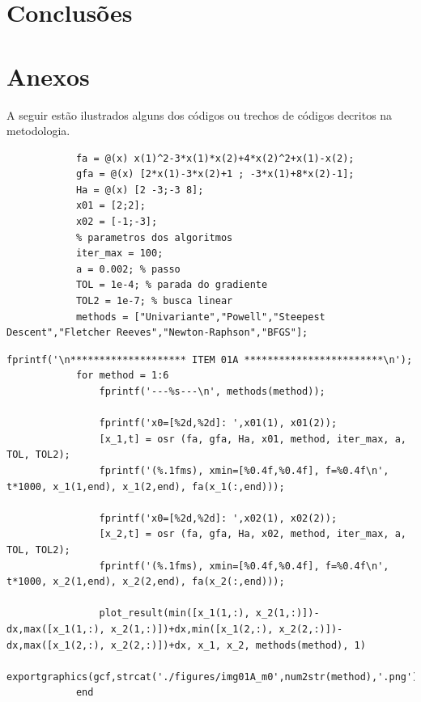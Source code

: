 \documentclass[10pt, a4paper]{article}
\begin{document}
\section{Conclus\~oes}



\section{Anexos}

A seguir est\~ao ilustrados alguns dos c\'odigos ou trechos de c\'odigos decritos na metodologia.

\begin{minipage}{\linewidth}
      \begin{lstlisting}[style=myStyle, caption=script t01.m setando par\^ametros e criando as fun\c c\~oes, label=l1]
            % dados do item 01a, f, grad f, hess f e x0
            fa = @(x) x(1)^2-3*x(1)*x(2)+4*x(2)^2+x(1)-x(2);
            gfa = @(x) [2*x(1)-3*x(2)+1 ; -3*x(1)+8*x(2)-1];
            Ha = @(x) [2 -3;-3 8];
            x01 = [2;2];
            x02 = [-1;-3];
            % parametros dos algoritmos
            iter_max = 100;
            a = 0.002; % passo
            TOL = 1e-4; % parada do gradiente
            TOL2 = 1e-7; % busca linear
            methods = ["Univariante","Powell","Steepest Descent","Fletcher Reeves","Newton-Raphson","BFGS"];
      \end{lstlisting}
\end{minipage}

\begin{minipage}{\linewidth}
      \begin{lstlisting}[style=myStyle, caption=script t01.m chamando o script osr.m para a fun\c c\~ao do item 1a para cada um dos 6 m\'etodos estudados, label=l2]
            fprintf('\n******************** ITEM 01A ************************\n');
            for method = 1:6
                fprintf('---%s---\n', methods(method));

                fprintf('x0=[%2d,%2d]: ',x01(1), x01(2));
                [x_1,t] = osr (fa, gfa, Ha, x01, method, iter_max, a, TOL, TOL2);
                fprintf('(%.1fms), xmin=[%0.4f,%0.4f], f=%0.4f\n', t*1000, x_1(1,end), x_1(2,end), fa(x_1(:,end)));

                fprintf('x0=[%2d,%2d]: ',x02(1), x02(2));
                [x_2,t] = osr (fa, gfa, Ha, x02, method, iter_max, a, TOL, TOL2);
                fprintf('(%.1fms), xmin=[%0.4f,%0.4f], f=%0.4f\n', t*1000, x_2(1,end), x_2(2,end), fa(x_2(:,end)));

                plot_result(min([x_1(1,:), x_2(1,:)])-dx,max([x_1(1,:), x_2(1,:)])+dx,min([x_1(2,:), x_2(2,:)])-dx,max([x_1(2,:), x_2(2,:)])+dx, x_1, x_2, methods(method), 1)
                exportgraphics(gcf,strcat('./figures/img01A_m0',num2str(method),'.png'),'Resolution',500)
            end
      \end{lstlisting}
\end{minipage}
\end{document}
